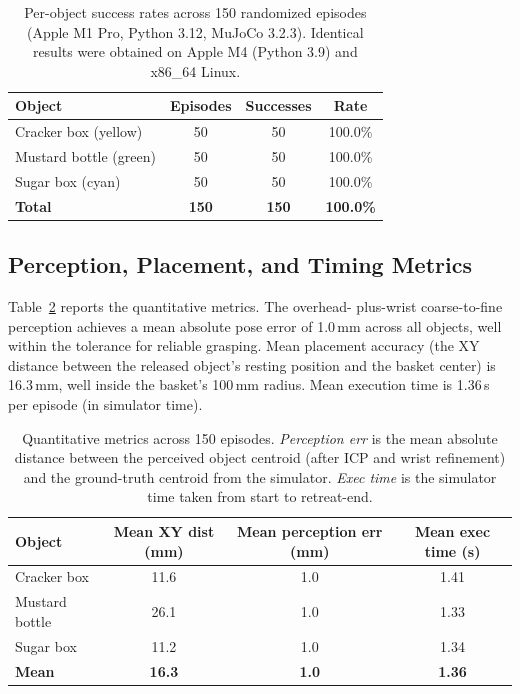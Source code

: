 \documentclass[11pt]{article}
\begin{document}
\begin{table}[h]
\centering
\begin{tabular}{lccc}
\toprule
Object & Episodes & Successes & Rate \\
\midrule
Cracker box (yellow)   & 50 & 50 & 100.0\% \\
Mustard bottle (green) & 50 & 50 & 100.0\% \\
Sugar box (cyan)       & 50 & 50 & 100.0\% \\
\midrule
\textbf{Total} & \textbf{150} & \textbf{150} & \textbf{100.0\%} \\
\bottomrule
\end{tabular}
\caption{Per-object success rates across 150 randomized episodes
(Apple M1 Pro, Python 3.12, MuJoCo 3.2.3). Identical results were
obtained on Apple M4 (Python 3.9) and x86\_64 Linux.}
\label{tab:results}
\end{table}

\subsection{Perception, Placement, and Timing Metrics}

Table~\ref{tab:metrics} reports the quantitative metrics. The overhead-
plus-wrist coarse-to-fine perception achieves a mean absolute pose error
of 1.0\,mm across all objects, well within the tolerance for reliable
grasping. Mean placement accuracy (the XY distance between the released
object's resting position and the basket center) is 16.3\,mm, well
inside the basket's 100\,mm radius. Mean execution time is 1.36\,s per
episode (in simulator time).

\begin{table}[h]
\centering
\begin{tabular}{lccc}
\toprule
Object & Mean XY dist (mm) & Mean perception err (mm) & Mean exec time (s) \\
\midrule
Cracker box   & 11.6 & 1.0 & 1.41 \\
Mustard bottle & 26.1 & 1.0 & 1.33 \\
Sugar box     & 11.2 & 1.0 & 1.34 \\
\midrule
\textbf{Mean} & \textbf{16.3} & \textbf{1.0} & \textbf{1.36} \\
\bottomrule
\end{tabular}
\caption{Quantitative metrics across 150 episodes.
\emph{Perception err} is the mean absolute distance between the perceived
object centroid (after ICP and wrist refinement) and the ground-truth
centroid from the simulator.
\emph{Exec time} is the simulator time taken from start to retreat-end.}
\label{tab:metrics}
\end{table}
\end{document}
